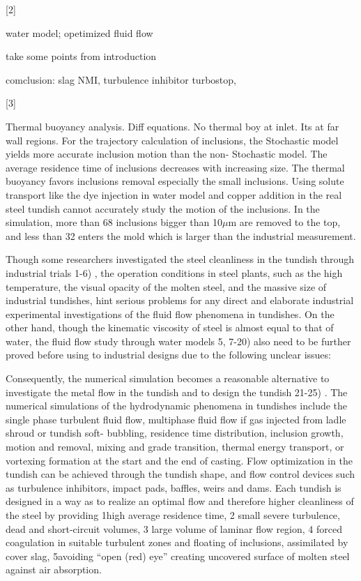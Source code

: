 [2]

water model; opetimized fluid flow

take some points from introduction

comclusion: slag NMI, turbulence inhibitor turbostop, 

[3]

Thermal buoyancy analysis. Diff equations.
No thermal boy at inlet. Its at far wall regions.
For the
trajectory calculation of inclusions, the Stochastic model
yields more accurate inclusion motion than the non-
Stochastic model. The average residence time of
inclusions decreases with increasing size. The thermal
buoyancy favors inclusions removal especially the small
inclusions. Using solute transport like the dye injection in
water model and copper addition in the real steel tundish
cannot accurately study the motion of the inclusions. In the
simulation, more than 68 inclusions bigger than 10$\mu$m
are removed to the top, and less than 32 enters the mold
which is larger than the industrial measurement.

Though some researchers investigated the steel cleanliness
in the tundish through industrial trials 1-6) , the operation
conditions in steel plants, such as the high temperature, the
visual opacity of the molten steel, and the massive size of
industrial tundishes, hint serious problems for any direct
and elaborate industrial experimental investigations of the
fluid flow phenomena in tundishes. On the other hand,
though the kinematic viscosity of steel is almost equal to
that of water, the fluid flow study through water models 5,
7-20)
also need to be further proved before using to
industrial designs due to the following unclear issues:

Consequently, the numerical simulation becomes a
reasonable alternative to investigate the metal flow in the
tundish and to design the tundish 21-25) . The numerical
simulations of the hydrodynamic phenomena in tundishes
include the single phase turbulent fluid flow, multiphase
fluid flow if gas injected from ladle shroud or tundish soft-
bubbling, residence time distribution, inclusion growth,
motion and removal, mixing and grade transition, thermal
energy transport, or vortexing formation at the start and
the end of casting. Flow optimization in the tundish can be
achieved through the tundish shape, and flow control
devices such as turbulence inhibitors, impact pads, baffles,
weirs and dams. Each tundish is designed in a way as to
realize an optimal flow and therefore higher cleanliness of
the steel by providing 1high average residence time, 2
small severe turbulence, dead and short-circuit volumes,
3 large volume of laminar flow region, 4 forced
coagulation in suitable turbulent zones and floating of
inclusions, assimilated by cover slag, 5avoiding “open
(red) eye” creating uncovered surface of molten steel
against air absorption.

